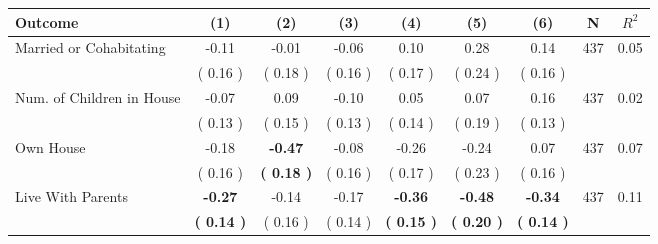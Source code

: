 \begin{tabular}{lcccccccc}
\toprule
 \textbf{Outcome} & \textbf{(1)} & \textbf{(2)} & \textbf{(3)} & \textbf{(4)} & \textbf{(5)} & \textbf{(6)} & \textbf{N} & \textbf{$ R^2$} \\
\midrule
Married or Cohabitating &     -0.11 &     -0.01 &     -0.06 &      0.10 &      0.28 &      0.14 & 437 &       0.05 \\ 
 & (     0.16 ) & (     0.18 ) & (     0.16 ) & (     0.17 ) & (     0.24 ) & (     0.16 ) & \\
Num. of Children in House &     -0.07 &      0.09 &     -0.10 &      0.05 &      0.07 &      0.16 & 437 &       0.02 \\ 
 & (     0.13 ) & (     0.15 ) & (     0.13 ) & (     0.14 ) & (     0.19 ) & (     0.13 ) & \\
Own House &     -0.18 & \textbf{    -0.47} &     -0.08 &     -0.26 &     -0.24 &      0.07 & 437 &       0.07 \\ 
 & (     0.16 ) & \textbf{(     0.18 )} & (     0.16 ) & (     0.17 ) & (     0.23 ) & (     0.16 ) & \\
Live With Parents & \textbf{    -0.27} &     -0.14 &     -0.17 & \textbf{    -0.36} & \textbf{    -0.48} & \textbf{    -0.34} & 437 &       0.11 \\ 
 & \textbf{(     0.14 )} & (     0.16 ) & (     0.14 ) & \textbf{(     0.15 )} & \textbf{(     0.20 )} & \textbf{(     0.14 )} & \\
\bottomrule
\end{tabular}

